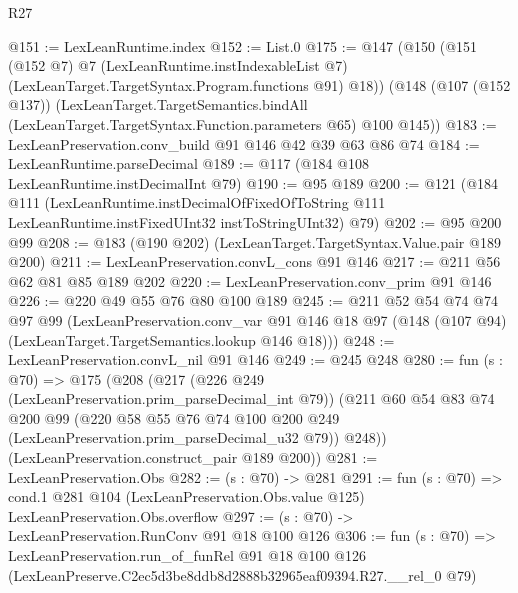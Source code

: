 \begin{lexlean}{R27}
\begin{coremodule}
@151 := LexLeanRuntime.index
@152 := List.{0}
@175 := @147
    (@150
      (@151
        (@152 @7)
        @7
        (LexLeanRuntime.instIndexableList @7)
        (LexLeanTarget.TargetSyntax.Program.functions @91)
        @18))
    (@148
      (@107 (@152 @137))
      (LexLeanTarget.TargetSemantics.bindAll
        (LexLeanTarget.TargetSyntax.Function.parameters @65)
        @100
        @145))
@183 := LexLeanPreservation.conv_build @91 @146 @42 @39 @63 @86 @74
@184 := LexLeanRuntime.parseDecimal
@189 := @117 (@184 @108 LexLeanRuntime.instDecimalInt @79)
@190 := @95 @189
@200 := @121
    (@184
      @111
      (LexLeanRuntime.instDecimalOfFixedOfToString
        @111
        LexLeanRuntime.instFixedUInt32
        instToStringUInt32)
      @79)
@202 := @95 @200 @99
@208 := @183 (@190 @202) (LexLeanTarget.TargetSyntax.Value.pair @189 @200)
@211 := LexLeanPreservation.convL_cons @91 @146
@217 := @211 @56 @62 @81 @85 @189 @202
@220 := LexLeanPreservation.conv_prim @91 @146
@226 := @220 @49 @55 @76 @80 @100 @189
@245 := @211
    @52
    @54
    @74
    @74
    @97
    @99
    (LexLeanPreservation.conv_var
      @91
      @146
      @18
      @97
      (@148 (@107 @94) (LexLeanTarget.TargetSemantics.lookup @146 @18)))
@248 := LexLeanPreservation.convL_nil @91 @146
@249 := @245 @248
@280 := fun (s : @70) =>
  @175
    (@208
      (@217
        (@226 @249 (LexLeanPreservation.prim_parseDecimal_int @79))
        (@211
          @60
          @54
          @83
          @74
          @200
          @99
          (@220 @58 @55 @76 @74 @100 @200 @249 (LexLeanPreservation.prim_parseDecimal_u32 @79))
          @248))
      (LexLeanPreservation.construct_pair @189 @200))
@281 := LexLeanPreservation.Obs
@282 := (s : @70) -> @281
@291 := fun (s : @70) =>
  cond.{1} @281 @104 (LexLeanPreservation.Obs.value @125) LexLeanPreservation.Obs.overflow
@297 := (s : @70) -> LexLeanPreservation.RunConv @91 @18 @100 @126
@306 := fun (s : @70) =>
  LexLeanPreservation.run_of_funRel
    @91
    @18
    @100
    @126
    (LexLeanPreserve.C2ec5d3be8ddb8d2888b32965eaf09394.R27.__rel_0 @79)
\end{coremodule}
\end{lexlean}
